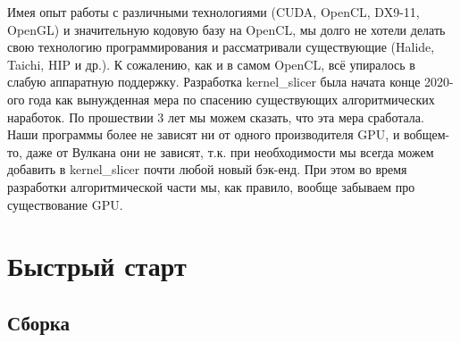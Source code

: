 \documentclass[11pt,fleqn,english,russian]{report} %
\begin{document}
\begin{remark}Имея опыт работы с различными технологиями (CUDA, OpenCL, DX9-11, OpenGL) и значительную кодовую базу на OpenCL, мы долго не хотели делать свою технологию программирования и рассматривали существующие (Halide, Taichi, HIP и др.). К сожалению, как и в самом OpenCL, всё упиралось в слабую аппаратную поддержку. Разработка kernel\_slicer была начата конце 2020-ого года как вынужденная мера по спасению существующих алгоритмических наработок. По прошествии 3 лет мы можем сказать, что эта мера сработала. Наши программы более не зависят ни от одного производителя GPU, и вобщем-то, даже от Вулкана они не зависят, т.к. при необходимости мы всегда можем добавить в kernel\_slicer почти любой новый бэк-енд. При этом во время разработки алгоритмической части мы, как правило, вообще забываем про существование GPU.
\end{remark}




\chapter{Быстрый старт}

\section{Сборка}
\end{document}
